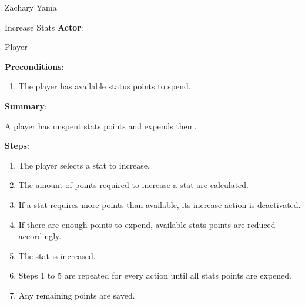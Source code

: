 \documentclass[12pt]{report}
\begin{document}
\begin{section}{Zachary Yama}
\begin{subsection}{Increase Stats}
\textbf{Actor}:

Player

\textbf{Preconditions}:

\begin{enumerate}
\item The player has available status points to spend.
\end{enumerate}

\textbf{Summary}:

A player has unspent stats points and expends them. 

\textbf{Steps}:

\begin{enumerate}
\item The player selects a stat to increase.
\item The amount of points required to increase a stat are calculated.
\item If a stat requires more points than available, its increase action is
deactivated.
\item If there are enough points to expend, available stats points are
reduced accordingly.
\item The stat is increased. 
\item Steps 1 to 5 are repeated for every action until all stats points are
expened.
\item Any remaining points are saved.
\end{enumerate}
\end{subsection}
\end{section}
\end{document}
